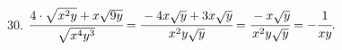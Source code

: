 30. $\cfrac{4\cdot\sqrt{x^2y}+x\sqrt{9y}}{\sqrt{x^4y^3}}=\cfrac{-4x\sqrt{y}+3x\sqrt{y}}{x^2y\sqrt{y}}=\cfrac{-x\sqrt{y}}{x^2y\sqrt{y}}=-\cfrac{1}{xy}.$\\
